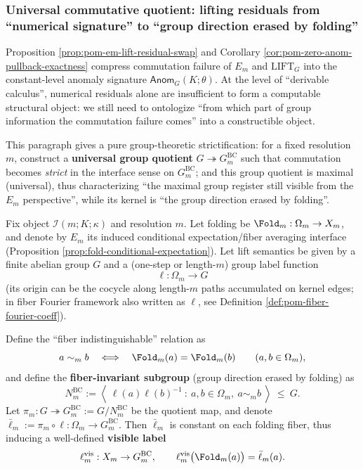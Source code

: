 \subsubsection{Universal commutative quotient: lifting residuals from ``numerical signature'' to ``group direction erased by folding''}\label{subsec:pom-bc-quotient}
Proposition \ref{prop:pom-em-lift-residual-swap} and Corollary \ref{cor:pom-zero-anom-pullback-exactness} compress commutation failure of \(E_m\) and \(\mathrm{LIFT}_G\) into the constant-level anomaly signature \(\mathsf{Anom}_G(K;\theta)\).
At the level of ``derivable calculus'', numerical residuals alone are insufficient to form a computable structural object: we still need to ontologize ``from which part of group information the commutation failure comes'' into a constructible object.
\par
This paragraph gives a pure group-theoretic strictification: for a fixed resolution \(m\), construct a \textbf{universal group quotient} \(G\twoheadrightarrow G^{\mathrm{BC}}_m\) such that commutation becomes \emph{strict} in the interface sense on \(G^{\mathrm{BC}}_m\); and this group quotient is maximal (universal), thus characterizing ``the maximal group register still visible from the \(E_m\) perspective'', while its kernel is ``the group direction erased by folding''.

\begin{definition}\label{def:pom-bc-quotient}
Fix object \(\mathcal{I}(m;K;\kappa)\) and resolution \(m\).
Let folding be \(\Fold_m:\Omega_m\to X_m\), and denote by \(E_m\) its induced conditional expectation/fiber averaging interface (Proposition \ref{prop:fold-conditional-expectation}).
Let lift semantics be given by a finite abelian group \(G\) and a (one-step or length-\(m\)) group label function
\[
\ell:\Omega_m\to G
\]
(its origin can be the cocycle along length-\(m\) paths accumulated on kernel edges; in fiber Fourier framework also written as \(\ell\), see Definition \ref{def:pom-fiber-fourier-coeff}).
\par
Define the ``fiber indistinguishable'' relation as
\[
a\sim_m b\quad\Longleftrightarrow\quad \Fold_m(a)=\Fold_m(b)\qquad(a,b\in\Omega_m),
\]
and define the \textbf{fiber-invariant subgroup} (group direction erased by folding) as
\[
N^{\mathrm{BC}}_m
:=\left\langle\ \ell(a)\ell(b)^{-1}\ :\ a,b\in\Omega_m,\ a\sim_m b\ \right\rangle\ \le\ G.
\]
Let \(\pi_m:G\twoheadrightarrow G^{\mathrm{BC}}_m:=G/N^{\mathrm{BC}}_m\) be the quotient map, and denote \(\bar\ell_m:=\pi_m\circ \ell:\Omega_m\to G^{\mathrm{BC}}_m\).
Then \(\bar\ell_m\) is constant on each folding fiber, thus inducing a well-defined \textbf{visible label}
\[
\ell^{\mathrm{vis}}_m:X_m\to G^{\mathrm{BC}}_m,
\qquad
\ell^{\mathrm{vis}}_m\bigl(\Fold_m(a)\bigr)=\bar\ell_m(a).
\]
\end{definition}

